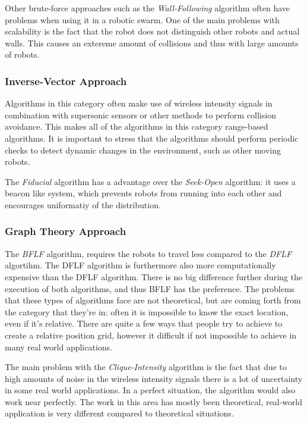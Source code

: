 Other brute-force approaches such as the \emph{Wall-Following} algorithm often have problems when using it in a robotic swarm. 
One of the main problems with scalability is the fact that the robot does not distinguish other robots and actual walls.
This causes an extereme amount of collisions and thus with large amounts of robots.

\subsubsection{Inverse-Vector Approach}
Algorithms in this category often make use of wireless intensity signals in combination with supersonic sensors or other methods to perform collision avoidance.
This makes all of the algorithms in this category range-based algorithms.
It is important to stress that the algorithms should perform periodic checks to detect dynamic changes in the environment, such as other moving robots. 

The \emph{Fiducial} algorithm has a advantage over the \emph{Seek-Open} algorithm: it uses a beacon like system, which prevents robots from running into each other and encourages uniformatiy of the distribution.

\subsubsection{Graph Theory Approach}
The \emph{BFLF} algorithm, requires the robots to travel less compared to the \emph{DFLF} algortihm. The DFLF algorithm is furthermore also more computationally expensive than the DFLF algorithm. There is no big difference further during the execution of both algorithms, and thus BFLF has the preference. The problems that these types of algorithms face are not theoretical, but are coming forth from the category that they're in: often it is impossible to know the exact location, even if it's relative. There are quite a few ways that people try to achieve to create a relative position grid, however it difficult if not impossible to achieve in many real world applications.

The main problem with the \emph{Clique-Intensity} algorithm is the fact that due to high amounts of noise in the wireless intensity signals there is a lot of uncertainty in some real world applications. In a perfect situation, the algorithm would also work near perfectly. The work in this area has mostly been theoretical, real-world application is very different compared to theoretical situations.\\

